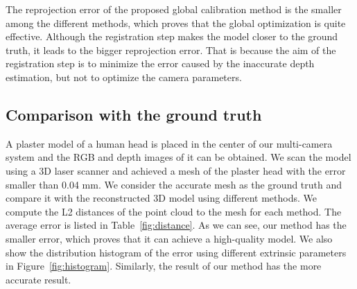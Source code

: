 The reprojection error of the proposed global calibration method is the smaller among the different methods, which proves that the global optimization is quite effective. Although the registration step makes the model closer to the ground truth, it leads to the bigger reprojection error. That is because the aim of the registration step is to minimize the error caused by the inaccurate depth estimation, but not to optimize the camera parameters.


\subsection{Comparison with the ground truth}


A plaster model of a human head is placed in the center of our multi-camera system and the RGB and depth images of it can be obtained.
We scan the model using a 3D laser scanner and achieved a mesh of the plaster head with the error smaller than 0.04 mm.
We consider the accurate mesh as the ground truth and compare it with the reconstructed 3D model using different methods.
We compute the L2 distances of the point cloud to the mesh for each method.  
%
The average error is listed in Table~\ref{fig:distance}. As we can see, our method has the smaller error, which proves that it can achieve a high-quality model.
We also show the distribution histogram of the error using different extrinsic parameters in Figure~\ref{fig:histogram}.
Similarly, the result of our method has the more accurate result.

